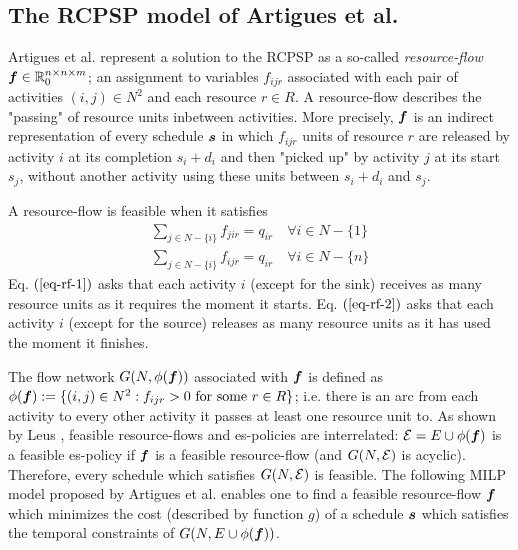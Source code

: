 	\subsection{The RCPSP model of Artigues et al.}
	 
	Artigues et al. \cite{artigues2003insertion}
	represent a solution to the RCPSP as a so-called \emph{resource-flow}
	$\boldsymbol{f} \in \mathbb{R}^{n\times n\times m}_0$;
	an assignment to variables $f_{ijr}$ associated 
	with each pair of activities $(i,j) \in N^2$ and each resource $r \in R$.
  	A resource-flow describes the "passing" of resource units inbetween activities.
 	More precisely, $\boldsymbol{f}$ is an indirect representation of every schedule $\boldsymbol{s}$ in which
 	$f_{ijr}$ units of resource $r$ are released by activity $i$ at its completion $s_i+d_i$
 	and then "picked up" by activity $j$ at its start $s_j$,
 	without another activity using these units between $s_i+d_i$ and $s_j$.
 	
 	A resource-flow is feasible when it satisfies
 	\begin{align}
 		\sum_{j \in N-\{i\}} f_{jir} = q_{ir}	\quad	\forall i \in N-\{1\} \label{eq-rf-1} \\
 		\sum_{j \in N-\{i\}} f_{ijr} = q_{ir} 	\quad	\forall i \in N-\{n\} \label{eq-rf-2}
  	\end{align}
 	Eq. $(\ref{eq-rf-1})$ asks that each activity $i$ (except for the sink)
 	receives as many resource units as it requires the moment it starts.
 	Eq. $(\ref{eq-rf-2})$ asks that each activity $i$ (except for the source)
	releases as many resource units as it has used the moment it finishes.
	
	The flow network $G(N,\phi(\boldsymbol{f}))$ associated with $\boldsymbol{f}$ is defined as
	$\phi(\boldsymbol{f}) := \{(i,j) \in N^2: f_{ijr} > 0 \textrm{ for some } r \in R\}$;
	i.e. there is an arc from each activity to every other activity it
	passes at least one resource unit to.
  	As shown by Leus \cite{leus2011resource,leus2011robust},
  	feasible resource-flows and es-policies are interrelated:
  	$\mathcal{E} = E \cup \phi(\boldsymbol{f})$ is a feasible es-policy if
  	$\boldsymbol{f}$ is a feasible resource-flow (and $G(N,\mathcal{E})$ is acyclic).
  	Therefore, every schedule which satisfies $G(N,\mathcal{E})$ is feasible.
  	The following MILP model proposed by Artigues et al.
  	enables one to find a feasible resource-flow $\boldsymbol{f}$
  	which minimizes the cost (described by function $g$)
  	of a schedule $\boldsymbol{s}$ which satisfies the 
  	temporal constraints of $G(N,E \cup \phi(\boldsymbol{f}))$.
   	
